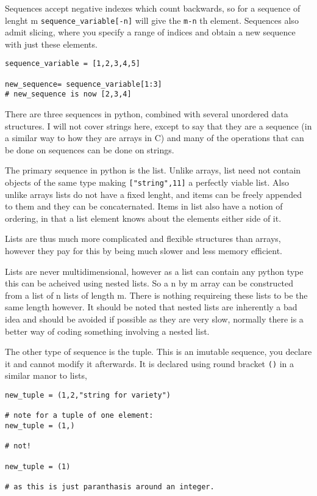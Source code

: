 \documentclass[11pt,a4paper]{article}
\begin{document}
Sequences accept negative indexes which count backwards, so for a sequence of lenght m \verb|sequence_variable[-n]| will give the \verb|m-n| th element. Sequences also admit slicing, where you specify a range of indices and obtain a new sequence with just these elements.

\begin{verbatim}
sequence_variable = [1,2,3,4,5]

new_sequence= sequence_variable[1:3]
# new_sequence is now [2,3,4]
\end{verbatim} 

There are three sequences in python, combined with several unordered data structures. I will not cover strings here, except to say that they are a sequence (in a similar way to how they are arrays in C) and many of the operations that can be done on sequences can be done on strings.

The primary sequence in python is the list. Unlike arrays, list need not contain objects of the same type making \verb|["string",11]| a perfectly viable list. Also unlike arrays lists do not have a fixed lenght, and items can be freely appended to them and they can be concaternated. Items in list also have a notion of ordering, in that a list element knows about the elements either side of it.

Lists are thus much more complicated and flexible structures than arrays, however they pay for this by being much slower and less memory efficient.

Lists are never multidimensional, however as a list can contain any python type this can be acheived using nested lists. So a n by m array can be constructed from a list of n lists of length m. There is nothing requireing these lists to be the same length however. It should be noted that nested lists are inherently a bad idea and should be avoided if possible as they are very slow, normally there is a better way of coding something involving a nested list.

The other type of sequence is the tuple. This is an imutable sequence, you declare it and cannot modify it afterwards. It is declared using round bracket \verb|()| in a similar manor to lists,

\begin{verbatim}
new_tuple = (1,2,"string for variety")

# note for a tuple of one element:
new_tuple = (1,)

# not!

new_tuple = (1)

# as this is just paranthasis around an integer.

\end{verbatim}
\end{document}
